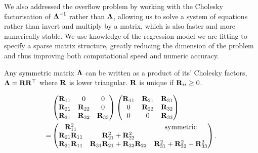 	We also addressed the overflow problem by working with the Cholesky factorisation of ${\boldsymbol \Lambda}^{-1}$
	rather than ${\boldsymbol \Lambda}$, allowing us to solve a system of equations rather than invert and multiply by a
	matrix, which is also faster and more numerically stable. We use knowledge of the regression  model we are
	fitting to specify a sparse matrix structure, greatly reducing the dimension of   the problem and thus
	improving both computational speed and numeric accuracy.
	
		
	Any symmetric matrix ${\boldsymbol \Lambda}$ can be written as a product of its' Cholesky factors, ${\boldsymbol \Lambda} =
	{\bf R} {\bf R}^\top$ where ${\bf R}$ is lower triangular. ${\bf R}$ is unique if ${\bf R}_{ii} \geq 0$.
		
	\begin{align*}
		&\begin{pmatrix}
		{\bf R}_{11}          & 0                                    & 0                                     \\
		{\bf R}_{21}          & {\bf R}_{22}                             & 0                                     \\
		{\bf R}_{31}          & {\bf R}_{32}                             & {\bf R}_{33}                              
		\end{pmatrix}
		\begin{pmatrix}
		{\bf R}_{11}          & {\bf R}_{21}                             & {\bf R}_{31}                              \\
		0                 & {\bf R}_{22}                             & {\bf R}_{32}                              \\
		0                 & 0                                    & {\bf R}_{33}                              
		\end{pmatrix}
		\\
		=& \begin{pmatrix}
		{\bf R}_{11}^2        &                                      & \text{symmetric}                      \\
		{\bf R}_{21}{\bf R}_{11} & {\bf R}_{21}^2 + {\bf R}_{22}^2 \\
		{\bf R}_{31} {\bf R}_{11} & {\bf R}_{31}{\bf R}_{21} + {\bf R}_{32} {\bf R}_{22} & {\bf R}_{31}^2 + {\bf R}_{32} ^2 + {\bf R}_{33}^2 
		\end{pmatrix}.
	\end{align*}
	
